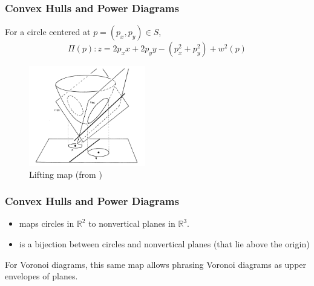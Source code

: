 \documentclass{beamer}
\newcommand{\R}{\mathbb{R}}
\begin{document}
\begin{frame}
  \frametitle{Convex Hulls and Power Diagrams}

  For a circle centered at $p = (p_x, p_y) \in S$,
  \[ \Pi(p): z = 2 p_x x + 2 p_y y - (p_x^2 + p_y^2) + w^2(p) \]

  \begin{figure}
    \includegraphics[width=2in]{lifting(aur_surv).png}
    \caption{Lifting map (from \cite{aurenhammer_survey})}
  \end{figure}

\end{frame}

\begin{frame}
  \frametitle{Convex Hulls and Power Diagrams}

  \begin{itemize}
    \item maps circles in $\R^2$ to nonvertical planes in $\R^3$.
    \item is a bijection between circles and nonvertical planes (that lie above the origin) \cite{aurenhammer_power}
  \end{itemize}

  For Voronoi diagrams, this same map allows phrasing Voronoi diagrams as upper envelopes of planes. \cite{comp_geom}

\end{frame}
\end{document}
